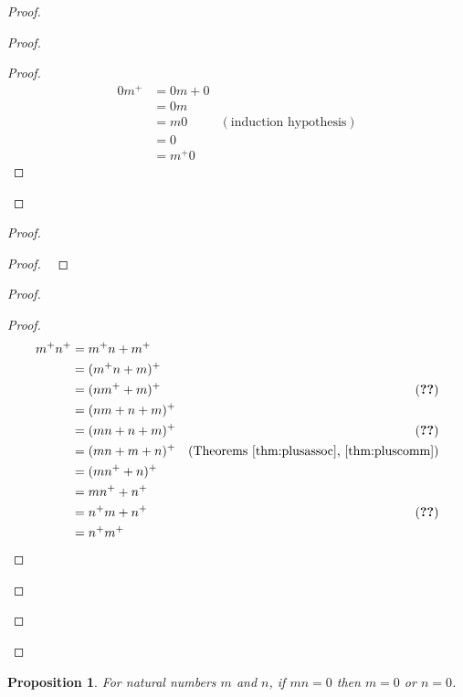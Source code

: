 \documentclass{book}
\let\qed\relax
\newtheorem{prop}[ax]{Proposition}
\theoremstyle{definition}
\begin{document}
\begin{proof}
\pf
{}
\begin{proof}
	\pf
	\begin{proof}
		\pf
		\begin{align*}
		0 m^+ & = 0m + 0 \\
		& = 0m \\
		& = m0 & (\text{induction hypothesis}) \\
		& = 0 \\
		& = m^+ 0
		\end{align*}
	\end{proof}
\end{proof}
\begin{proof}
	\begin{proof}
		\pf\ 
	\end{proof}
	\begin{proof}
		\pf
		\begin{proof}
		\pf
		\begin{align*}
			m^+ n^+ & = m^+ n + m^+ \\
			& = (m^+ n + m)^+ \\
			& = (nm^+ + m)^+ & (\text{\stepref{b}}) \\
			& = (nm + n + m)^+ \\
			& = (mn + n + m)^+ & (\text{\stepref{b}}) \\
			& = (mn + m + n)^+ & (\text{Theorems \ref{thm:plusassoc}, \ref{thm:pluscomm}}) \\
			& = (mn^+ + n)^+ \\
			& = mn^+ + n^+ \\
			& = n^+ m + n^+ & (\text{\stepref{ii}}) \\
			& = n^+ m^+
		\end{align*}
		\end{proof}
	\end{proof}
\end{proof}
\qed
\end{proof}

\begin{prop}
For natural numbers $m$ and $n$, if $mn = 0$ then $m = 0$ or $n = 0$.
\end{prop}
\end{document}
